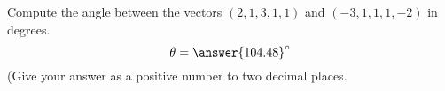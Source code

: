 \begin{problem}
Compute the angle between the vectors $(2,1,3,1,1)$ and $(-3,1,1,1,-2)$ in degrees.
\[
\theta = \answer{104.48}^\circ
\]
(Give your answer as a positive number to two decimal places.
\end{problem}